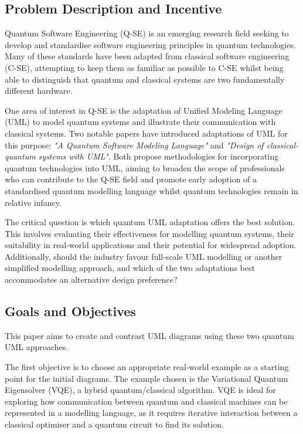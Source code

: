 \documentclass{article}
\begin{document}
\subsection{Problem Description and Incentive}

Quantum Software Engineering (Q-SE) is an emerging research field seeking to develop and standardise software engineering principles in quantum technologies. Many of these standards have been adapted from classical software engineering (C-SE), attempting to keep them as familiar as possible to C-SE whilst being able to distinguish that quantum and classical systems are two fundamentally different hardware. 

One area of interest in Q-SE is the adaptation of Unified Modeling Language (UML) to model quantum systems and illustrate their communication with classical systems. Two notable papers have introduced adaptations of UML for this purpose: \textit{"A Quantum Software Modeling Language"}\cite{Pérez-Delgado2022} and \textit{"Design of classical-quantum systems with UML"}\cite{Pérez-Castillo2022}. Both propose methodologies for incorporating quantum technologies into UML, aiming to broaden the scope of professionals who can contribute to the Q-SE field and promote early adoption of a standardised quantum modelling language whilst quantum technologies remain in relative infancy. 

The critical question is which quantum UML adaptation offers the best solution. This involves evaluating their effectiveness for modelling quantum systems, their suitability in real-world applications and their potential for widespread adoption. Additionally, should the industry favour full-scale UML modelling or another simplified modelling approach, and which of the two adaptations best accommodates an alternative design preference?

\subsection{Goals and Objectives}

This paper aims to create and contrast UML diagrams using these two quantum UML approaches.

The first objective is to choose an appropriate real-world example as a starting point for the initial diagrams. The example chosen is the Variational Quantum Eigensolver (VQE), a hybrid quantum/classical algorithm. VQE is ideal for exploring how communication between quantum and classical machines can be represented in a modelling language, as it requires iterative interaction between a classical optimiser and a quantum circuit to find its solution. 
\end{document}
